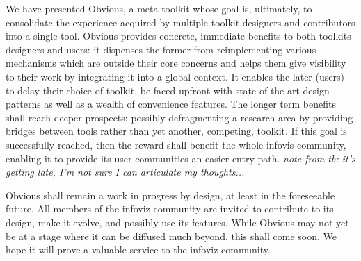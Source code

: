 
We have presented Obvious, a meta-toolkit whose goal is, ultimately, to consolidate the experience acquired by multiple toolkit designers and contributors into a single tool. Obvious provides concrete, immediate benefits to both toolkits designers and users: it dispenses the former from reimplementing various mechanisms which are outside their core concerns and helps them give visibility to their work by integrating it into a global context. It enables the later (users) to delay their choice of toolkit, be faced upfront with state of the art design patterns as well as a wealth of convenience features. The longer term benefits shall reach deeper prospects: possibly defragmenting a research area by providing bridges between tools rather than yet another, competing, toolkit. If this goal is successfully reached, then the reward shall benefit the whole infovis community, enabling it to provide its user communities an easier entry path. \emph{note from tb: it's getting late, I'm not sure I can articulate my thoughts...}

Obvious shall remain a work in progress by design, at least in the foreseeable future. All members of the infoviz community are invited to contribute to its design, make it evolve, and possibly use its features. While Obvious may not yet be at a stage where it can be diffused much beyond, this shall come soon. We hope it will prove a valuable service to the infoviz community. 
